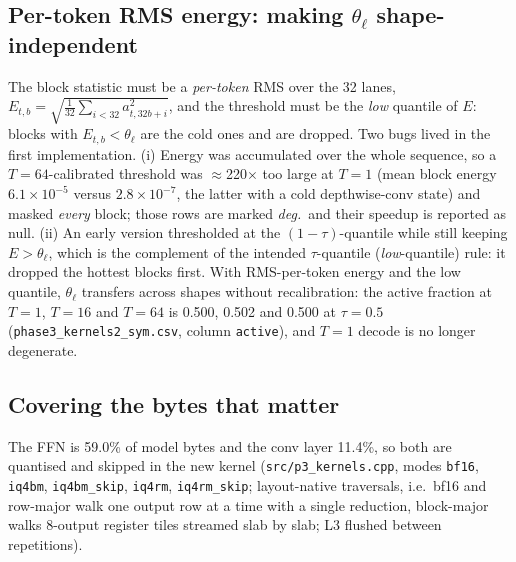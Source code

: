 \documentclass[11pt]{article}
\newcommand{\thetal}{\theta_\ell}
\newcommand{\code}[1]{\texttt{\small #1}}
\begin{document}
\subsection{Per-token RMS energy: making $\thetal$ shape-independent}\label{sec:rms}
The block statistic must be a \emph{per-token} RMS over the 32 lanes,
$E_{t,b}=\sqrt{\tfrac{1}{32}\sum_{i<32}a_{t,32b+i}^{2}}$, and the threshold must be the
\emph{low} quantile of $E$: blocks with $E_{t,b}<\thetal$ are the cold ones and are
dropped. Two bugs lived in the first implementation. (i) Energy was accumulated over the
whole sequence, so a $T{=}64$-calibrated threshold was $\approx$220$\times$ too large at
$T{=}1$ (mean block energy $6.1\times10^{-5}$ versus $2.8\times10^{-7}$, the latter with a
cold depthwise-conv state) and masked \emph{every} block; those rows are marked
\textit{deg.}\ and their speedup is reported as null. (ii) An early version thresholded at the
$(1-\tau)$-quantile while still keeping $E>\thetal$, which is the complement of the intended
$\tau$-quantile (\emph{low}-quantile) rule: it dropped the hottest blocks first. With RMS-per-token energy and the low quantile, $\thetal$
transfers across shapes without recalibration: the active fraction at $T{=}1$, $T{=}16$ and
$T{=}64$ is 0.500, 0.502 and 0.500 at $\tau{=}0.5$ (\code{phase3\_kernels2\_sym.csv},
column \code{active}), and $T{=}1$ decode is no longer degenerate.

\subsection{Covering the bytes that matter}\label{sec:cover}
The FFN is 59.0\% of model bytes and the conv layer 11.4\%, so both are quantised and
skipped in the new kernel (\code{src/p3\_kernels.cpp}, modes \code{bf16}, \code{iq4bm},
\code{iq4bm\_skip}, \code{iq4rm}, \code{iq4rm\_skip}; layout-native traversals, i.e.\ bf16
and row-major walk one output row at a time with a single reduction, block-major walks
8-output register tiles streamed slab by slab; L3 flushed between repetitions).

\begin{table}[h]\centering\small
\resizebox{0.98\textwidth}{!}{}
\caption{Cold-flushed layer latency ($\mu$s) and speedup against dense bf16 at the same
shape, $\tau{=}0.5$, symmetric codebook. \code{iq4bm} = block-major \code{IQ4\_NL}
dense; \code{+skip} adds Variant-A block skipping; \code{rm} = the row-major layout
Paper~2 forbids. At $T{=}1$ the layer is pure streaming and block-major skipping wins
2.58$\times$ (FFN) and 4.07$\times$ (conv); at $T{\ge}16$ the arithmetic dominates and
the same skip is worth only 1.16--1.34$\times$, because skip saves bytes but not FLOPs.}
\end{table}
\end{document}
